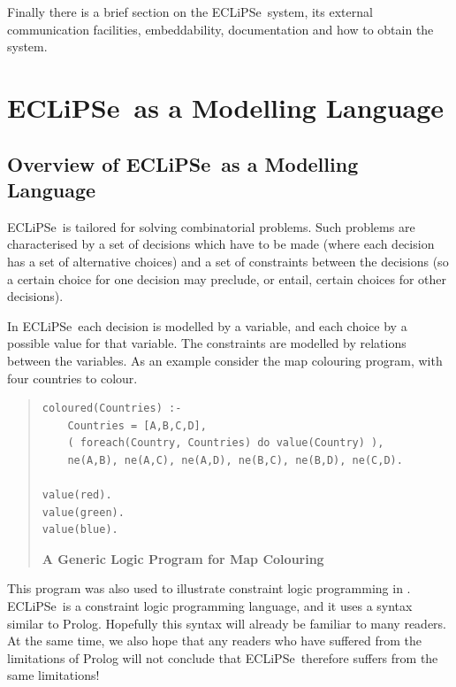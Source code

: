 \documentclass[a4wide]{article}
\newcommand{\ECL}{\mbox{ECLiPSe\ }{\hspace{1mm}}}
\begin{document}

Finally there is a brief section on the \ECL system, its external
communication facilities, embeddability, documentation and how to
obtain the system. 


\section{\ECL as a Modelling Language}

\label{conceptual}
\subsection{Overview of \ECL as a Modelling Language}
\ECL is tailored for solving combinatorial problems.  Such problems
are characterised by a set of decisions which have to be made (where
each decision has a set of alternative choices) and a set of
constraints between the decisions (so a certain choice for one
decision may preclude, or entail, certain choices for other
decisions).
 
In \ECL each decision is modelled by a variable, and each choice
by a possible value for that variable.  The constraints are modelled
by relations between the variables.
As an example consider the map colouring program, with four countries
to colour.
\begin{quote}
\begin{verbatim}
coloured(Countries) :-
    Countries = [A,B,C,D],
    ( foreach(Country, Countries) do value(Country) ),
    ne(A,B), ne(A,C), ne(A,D), ne(B,C), ne(B,D), ne(C,D).

value(red).
value(green).
value(blue).
\end{verbatim}
{\bf A Generic Logic Program for Map Colouring}
\label{mapconceptual}
\end{quote}

This program was also used to illustrate constraint logic programming
in \cite{consprog}.
\ECL is a constraint logic programming language, and it uses a
syntax similar to Prolog.
Hopefully this syntax will already be familiar to many readers.
At the same time, we also hope that any readers who have suffered from
the limitations of Prolog will not conclude that \ECL therefore
suffers from the same limitations!
\end{document}
